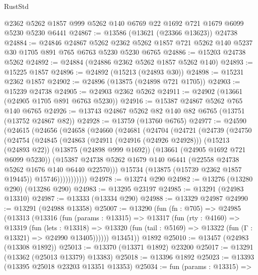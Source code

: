 \begin{lexlean}{RustStd}
\begin{coremodule}
    @2362
    @5262
    @1857
    @999
    @5262
    @140
    @6769
    @22
    @1692
    @721
    @1679
    @6099
    @5230
    @5230
    @6441
@24867 := @13586 (@13621 (@23366 @13623)) @24738
@24884 := @24846
    @24867
    @5262
    @2362
    @5262
    @1857
    @721
    @5262
    @140
    @5237
    @30
    @1705
    @891
    @765
    @6763
    @5230
    @5230
    @6765
@24886 := @15203 @24738 @5262
@24892 := @24884 (@24886 @2362 @5262 @1857 @5262 @140)
@24893 := @15225 @1857
@24896 := @24892 (@15213 (@24893 @30))
@24898 := @15231 @2362 @1857
@24902 := @24896 (@13875 (@24898 @721 @1705))
@24903 := @15239 @24738
@24905 := @24903 @2362 @5262
@24911 := @24902 (@13661 (@24905 @1705 @891 @6763 @5230))
@24916 := @15387 @24867 @5262 @765 @140 @6765
@24926 := @13743 @24867 @5262 @82 @140 @82 @6765 (@13751 (@13752 @24867 @82))
@24928 := @13759 (@13760 @6765)
@24977 := @24590
    (@24615
      (@24656
        (@24658
          (@24660
            (@24681
              (@24704
                (@24721
                  (@24739
                    (@24750
                      (@24754
                        (@24845
                          (@24863
                            (@24911 (@24916 (@24926 @24928)))
                            (@15213 (@24893 @22))
                            (@13875 (@24898 @999 @1692))
                            (@13661 (@24905 @1692 @721 @6099 @5230))
                            (@15387
                              @24738
                              @5262
                              @1679
                              @140
                              @6441
                              (@22558 @24738 @5262 @1676 @140 @6440 @22570)))
                          @15734
                          (@13875 (@15739 @2362 @1857 @19445))
                          @15746)))))))))))
@24978 := @13274 @290
@24982 := @13276 (@13280 @290) (@13286 @290)
@24983 := @13295 @23197
@24985 := @13291 (@24983 @13310)
@24987 := @13333 (@13334 @290)
@24988 := @13329 @24987
@24990 := @13291 (@24988 @13358)
@25007 := @13290
    (fun (fn : @705) =>
    @24985
      (@13313
        (@13316
          (fun (params : @13315) =>
          @13317
            (fun (rty : @4160) =>
            @13319
              (fun (lets : @13318) =>
              @13320 (fun (tail : @5169) => @13322 (fun (Γ : @13321) => @24990 @13405))))))
        @13451))
    @1892
@25010 := @13457 (@24983 (@13308 @1892))
@25013 := @13370 (@13371 @1892) @23200
@25017 := @13291 (@13362 (@25013 @13379) @13383)
@25018 := @13396 @1892
@25023 := @13393 (@13395 @25018 @23203 @13351 @13353)
@25034 := fun (params : @13315) =>

\end{coremodule}
\end{lexlean}
